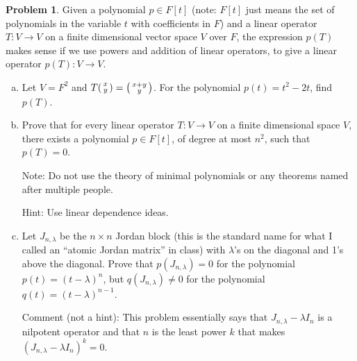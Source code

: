 \documentclass[11pt,oneside]{amsart}
\theoremstyle{definition}
\newtheorem{problem}{Problem}
\newcommand*\colvec[1]{\begin{psmallmatrix}#1\end{psmallmatrix}}
\begin{document}
    \begin{problem}
        Given a polynomial $p\in F[t]$ (note: $F[t]$ just means the set of polynomials in the variable $t$ with coefficients in $F$) and a linear operator $T\colon V\to V$ on a finite dimensional vector space $V$ over $F$, the expression $p(T)$ makes sense if we use powers and addition of linear operators, to give a linear operator $p(T)\colon V\to V$.

        \begin{enumerate}[(a)]
            \item Let $V=F^2$ and $T\colvec{x\\y}=\colvec{x+y\\y}$. For the polynomial $p(t)=t^2-2t$, find $p(T)$.
            \item Prove that for every linear operator $T\colon V\to V$ on a finite dimensional space $V$, there exists a polynomial $p\in F[t]$, of degree at most $n^2$, such that $p(T)=0$.
            
            Note: Do not use the theory of minimal polynomials or any theorems named after multiple people.

            Hint: Use linear dependence ideas.
            \item Let $J_{n,\lambda}$ be the $n\times n$ Jordan block (this is the standard name for what I called an ``atomic Jordan matrix'' in class) with $\lambda$'s on the diagonal and 1's above the diagonal. Prove that $p(J_{n,\lambda})=0$ for the polynomial $p(t)=(t-\lambda)^n$, but $q(J_{n,\lambda})\neq 0$ for the polynomial $q(t)=(t-\lambda)^{n-1}$.
            
            Comment (not a hint): This problem essentially says that $J_{n,\lambda}-\lambda I_n$ is a nilpotent operator and that $n$ is the least power $k$ that makes $(J_{n,\lambda}-\lambda I_n)^k=0$.
        \end{enumerate}
    \end{problem}
    
\end{document}
